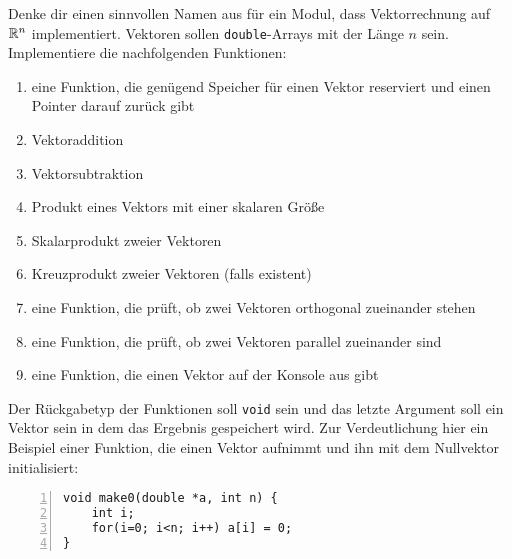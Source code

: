 \documentclass{uebungszettel}
\begin{document}
\begin{aufg}
Denke dir einen sinnvollen Namen aus für ein Modul, dass Vektorrechnung auf $\mathbb{R}^n$ implementiert. Vektoren sollen \verb|double|-Arrays mit der Länge $n$ sein. Implementiere die nachfolgenden Funktionen:
\begin{enumerate}
	\item eine Funktion, die genügend Speicher für einen Vektor reserviert und einen Pointer darauf zurück gibt
	\item Vektoraddition
	\item Vektorsubtraktion
	\item Produkt eines Vektors mit einer skalaren Größe
	\item Skalarprodukt zweier Vektoren
	\item Kreuzprodukt zweier Vektoren (falls existent)
	\item eine Funktion, die prüft, ob zwei Vektoren orthogonal zueinander stehen
	\item eine Funktion, die prüft, ob zwei Vektoren parallel zueinander sind
	\item eine Funktion, die einen Vektor auf der Konsole aus gibt
\end{enumerate}
Der Rückgabetyp der Funktionen soll \verb|void| sein und das letzte Argument soll ein Vektor sein in dem das Ergebnis gespeichert wird. Zur Verdeutlichung hier ein Beispiel einer Funktion, die einen Vektor aufnimmt und ihn mit dem Nullvektor initialisiert:
\begin{codelisting}
\begin{lstlisting}[numbers=left,numberstyle=\tiny,frame=tlrb]
void make0(double *a, int n) { 
	int i;
	for(i=0; i<n; i++) a[i] = 0;
}
\end{lstlisting}
\end{codelisting}
\end{aufg}
\end{document}
